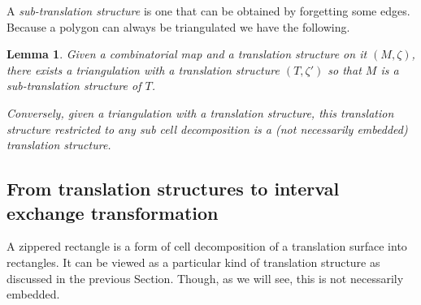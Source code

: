 \documentclass{article}
\newtheorem{lemma}[definition]{Lemma}
\begin{document}
A \emph{sub-translation structure} is one that can be obtained by forgetting
some edges. Because a polygon can always be triangulated we have the following.
\begin{lemma}
Given a combinatorial map and a translation structure on it $(M,\zeta)$, there
exists a triangulation with a translation structure $(T,\zeta')$ so that $M$ is
a sub-translation structure of $T$.

Conversely, given a triangulation with a translation structure, this translation
structure restricted to any sub cell decomposition is a (not necessarily embedded)
translation structure.
\end{lemma}

\subsection{From translation structures to interval exchange transformation}
A zippered rectangle is a form of cell decomposition of a translation
surface into rectangles. It can be viewed as a particular kind of translation
structure as discussed in the previous Section. Though, as we will see, this
is not necessarily embedded.
\end{document}

